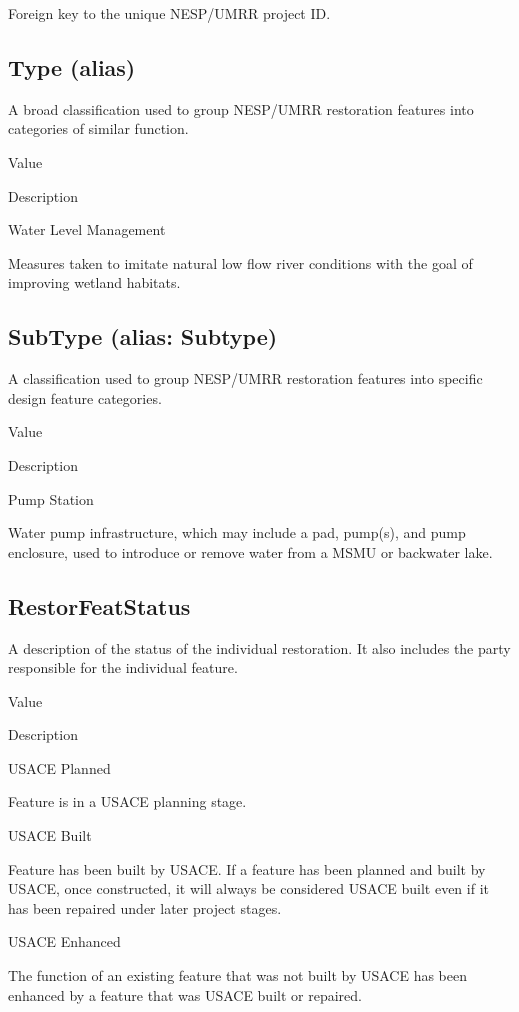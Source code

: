 \documentclass[
  letterpaper,
  DIV=11,
  numbers=noendperiod]{scrreprt}
\begin{document}
Foreign key to the unique NESP/UMRR project ID.

\subsection{Type (alias)}\label{type-alias-9}

A broad classification used to group NESP/UMRR restoration features into
categories of similar function.

Value

Description

Water Level Management

Measures taken to imitate natural low flow river conditions with the
goal of improving wetland habitats.

\subsection{SubType (alias: Subtype)}\label{subtype-alias-subtype-10}

A classification used to group NESP/UMRR restoration features into
specific design feature categories.

Value

Description

Pump Station

Water pump infrastructure, which may include a pad, pump(s), and pump
enclosure, used to introduce or remove water from a MSMU or backwater
lake.

\subsection{RestorFeatStatus}\label{restorfeatstatus-10}

A description of the status of the individual restoration. It also
includes the party responsible for the individual feature.

Value

Description

USACE Planned

Feature is in a USACE planning stage.

USACE Built

Feature has been built by USACE. If a feature has been planned and built
by USACE, once constructed, it will always be considered USACE built
even if it has been repaired under later project stages.

USACE Enhanced

The function of an existing feature that was not built by USACE has been
enhanced by a feature that was USACE built or repaired.
\end{document}
